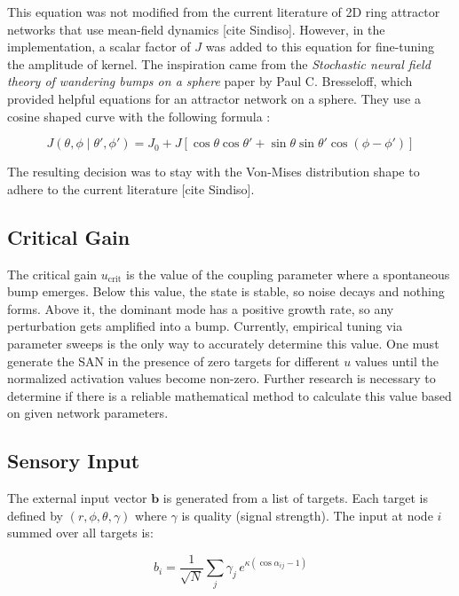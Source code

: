 \documentclass[12pt, letterpaper]{article}
\begin{document}
This equation was not modified from the current literature of 2D ring attractor networks that use mean-field dynamics [cite Sindiso]. However, in the implementation, a scalar factor of $J$ was added to this equation for fine-tuning the amplitude of kernel. The inspiration came from the \textit{Stochastic neural field theory of wandering bumps on a sphere} paper by Paul C. Bresseloff, which provided helpful equations for an attractor network on a sphere. They use a cosine shaped curve with the following formula \cite{bressloff2019stochastic}: 

\begin{equation}
        J(\theta, \phi \mid \theta', \phi') = J_0 + J \left[ \cos\theta \cos\theta' + \sin\theta \sin\theta' \cos(\phi - \phi') \right]
\end{equation}

The resulting decision was to stay with the Von-Mises distribution shape to adhere to the current literature [cite Sindiso].

\subsection{Critical Gain}
 The critical gain $u_{\text{crit}}$ is the value of the coupling parameter where a spontaneous bump emerges. Below this value, the state is stable, so noise decays and nothing forms. Above it, the dominant mode has a positive growth rate, so any perturbation gets amplified into a bump. Currently, empirical tuning via parameter sweeps is the only way to accurately determine this value. One must generate the SAN in the presence of zero targets for different $u$ values until the normalized activation values become non-zero. Further research is necessary to determine if there is a reliable mathematical method to calculate this value based on given network parameters.

\subsection{Sensory Input}

The external input vector $\mathbf{b}$ is generated from a list of targets. Each target is defined by $(r, \phi, \theta, \gamma)$ where $\gamma$ is quality (signal strength). The input at node $i$ summed over all targets is:

\begin{equation}
    b_i = \frac{1}{\sqrt{N}} \sum_j \gamma_j \, e^{\kappa(\cos \alpha_{ij} - 1)}
\end{equation}
\end{document}
